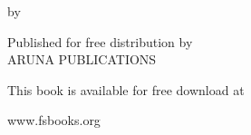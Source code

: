 \cleartorecto
\thispagestyle{empty}

{\raggedleft
\firaSansLightFont
\color[gray]{0.35}%

\vspace*{4\baselineskip}
\setlength{\parskip}{1em}
\setlength{\parindent}{0pt}

{\fontsize{22}{25}\selectfont
\color[gray]{0.3}%
\MakeUppercase{\thetitle}}

\vspace*{0.9\baselineskip}

{\fontsize{12}{15}\selectfont
by \theauthor}

\vfill

Published for free distribution by\\
ARUNA PUBLICATIONS

This book is available for free download at

\vspace*{-0.8\baselineskip}%
{\fontsize{10}{12}\selectfont
www.fsbooks.org}%

}

